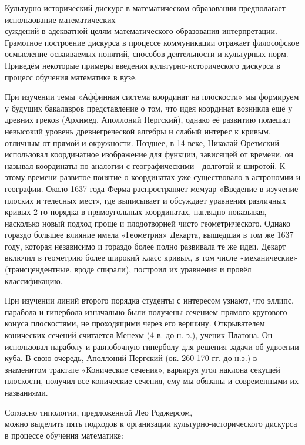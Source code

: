 Культурно-исторический дискурс в математическом образовании предполагает использование математических \\суждений в адекватной целям математического образования интерпретации. Грамотное построение дискурса в процессе коммуникации отражает философское осмысление ос\-ваиваемых понятий, способов деятельности и культурных норм. Приведём некоторые примеры введения культурно-исторического дискурса в процесс обучения математике в вузе.

При изучении темы «Аффинная система координат на плоскости» мы формируем у будущих бакалавров представление о том, что идея координат возникла ещё у древних греков (Архимед, Аполлоний Пергский), однако её развитию помешал невысокий уровень древнегреческой алгебры и слабый интерес к кривым, отличным от прямой и окружности. Позднее, в 14 веке, Николай Орезмский использовал координатное изображение для функции, зависящей от времени, он называл координаты по аналогии с географическими - долготой и широтой. К этому времени развитое понятие о координатах уже существовало в астрономии и географии. Около 1637 года Ферма распространяет мемуар «Введение в изучение плоских и телесных мест», где выписывает и обсуждает уравнения различных кривых 2-го порядка в прямоугольных координатах, наглядно показывая, насколько новый подход проще и плодотворней чисто геометрического. Однако гораздо большее влияние имела «Геометрия» Декарта, вышедшая в том же 1637 году, которая независимо и гораздо более полно развивала те же идеи. Декарт включил в геометрию более широкий класс кривых, в том числе «механические» (трансцендентные, вроде спирали), построил их уравнения и провёл классификацию.

При изучении линий второго порядка студенты с интересом узнают, что эллипс, парабола и гипербола изначально были получены сечением прямого кругового конуса плоскостями, не проходящими через его вершину. Открывателем конических сечений считается Менехм (4 в. до н. э.), ученик Платона. Он использовал параболу и равнобочную гиперболу для решения задачи об удвоении куба. В свою очередь, Аполлоний Пергский (ок. 260-170 гг. до н.э.) в знаменитом трактате «Конические сечения», варьируя угол наклона секущей плоскости, получил все конические сечения, ему мы обязаны и современными их названиями.

Согласно типологии, предложенной Лео Роджерсом, \\можно выделить пять подходов к организации культурно-исторического дискурса в процессе обучения математике:

